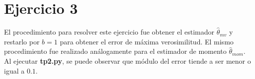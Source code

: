 \section{Ejercicio 3}
El procedimiento para resolver este ejercicio fue obtener el estimador $\hat{\theta}_{mv}$ y restarlo por $b=1$ para obtener el error de máxima verosimilitud. El mismo procedimiento fue realizado análogamente para el estimador de momento $\hat{\theta}_{mom}$. Al ejecutar \textbf{tp2.py}, se puede observar que módulo del error tiende a ser menor o igual a $0.1$.